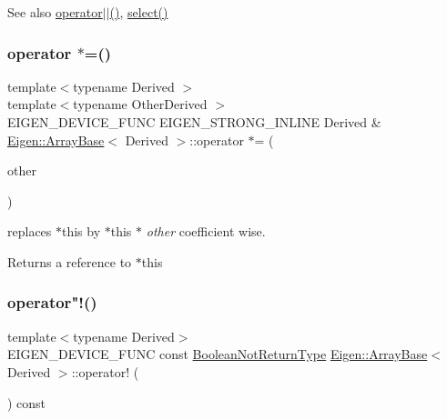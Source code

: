\begin{DoxySeeAlso}{See also}
\mbox{\hyperlink{class_eigen_1_1_array_base_a7c2e31673c2243b135e13de05de6e636}{operator$\vert$$\vert$()}}, \mbox{\hyperlink{class_eigen_1_1_dense_base_a65e78cfcbc9852e6923bebff4323ddca}{select()}} 
\end{DoxySeeAlso}
\mbox{\label{class_eigen_1_1_array_base_a692a601054a505dce15bb5dd353e7923}} 
\subsubsection{\texorpdfstring{operator $\ast$=()}{operator *=()}}
{\footnotesize\ttfamily template$<$typename Derived $>$ \\
template$<$typename Other\+Derived $>$ \\
E\+I\+G\+E\+N\+\_\+\+D\+E\+V\+I\+C\+E\+\_\+\+F\+U\+NC E\+I\+G\+E\+N\+\_\+\+S\+T\+R\+O\+N\+G\+\_\+\+I\+N\+L\+I\+NE Derived \& \mbox{\hyperlink{class_eigen_1_1_array_base}{Eigen\+::\+Array\+Base}}$<$ Derived $>$\+::operator $\ast$= (\begin{DoxyParamCaption}\item[{const \mbox{\hyperlink{class_eigen_1_1_array_base}{Array\+Base}}$<$ Other\+Derived $>$ \&}]{other }\end{DoxyParamCaption})}

replaces {\ttfamily $\ast$this} by {\ttfamily $\ast$this} $\ast$ {\itshape other} coefficient wise.

\begin{DoxyReturn}{Returns}
a reference to {\ttfamily $\ast$this} 
\end{DoxyReturn}
\mbox{\label{class_eigen_1_1_array_base_a43cb8d15f6ad4ee1f0a03bf6a4dc673a}} 
\subsubsection{\texorpdfstring{operator"!()}{operator!()}}
{\footnotesize\ttfamily template$<$typename Derived$>$ \\
E\+I\+G\+E\+N\+\_\+\+D\+E\+V\+I\+C\+E\+\_\+\+F\+U\+NC const \mbox{\hyperlink{class_eigen_1_1_cwise_unary_op}{Boolean\+Not\+Return\+Type}} \mbox{\hyperlink{class_eigen_1_1_array_base}{Eigen\+::\+Array\+Base}}$<$ Derived $>$\+::operator! (\begin{DoxyParamCaption}{ }\end{DoxyParamCaption}) const\hspace{0.3cm}{\ttfamily [inline]}}

